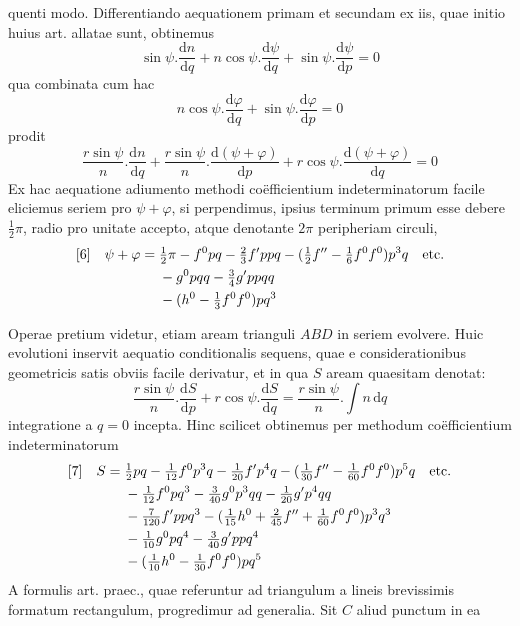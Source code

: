 %
quenti modo. Differentiando aequationem primam et secundam ex iis, quae initio huius art. allatae sunt, obtinemus
\[
\sin\psi\mathord{.}\frac{\mathrm{d}n}{\mathrm{d}q}+n\cos\psi\mathord{.}\frac{\mathrm{d}\psi}{\mathrm{d}q}+\sin\psi\mathord{.}\frac{\mathrm{d}\psi}{\mathrm{d}p}=0
\]
qua combinata cum hac
\[
n\cos\psi\mathord{.}\frac{\mathrm{d}\varphi}{\mathrm{d}q}+\sin\psi\mathord{.}\frac{\mathrm{d}\varphi}{\mathrm{d}p}=0
\]
prodit
\[
\frac{r\sin\psi}{n}\mathord{.}\frac{\mathrm{d}n}{\mathrm{d}q}+\frac{r\sin\psi}{n}\mathord{.}\frac{\mathrm{d}(\psi+\varphi)}{\mathrm{d}p}+r\cos\psi\mathord{.}\frac{\mathrm{d}(\psi+\varphi)}{\mathrm{d}q}=0
\]
Ex hac aequatione adiumento methodi coëfficientium indeterminatorum facile eliciemus seriem pro \(\psi+\varphi\), si perpendimus, ipsius terminum primum esse debere \(\tfrac{1}{2}\pi\), radio pro unitate accepto, atque denotante \(2\pi\) peripheriam circuli,
\[
\begin{aligned}
\relax[6]\quad\psi+\varphi={}&\tfrac{1}{2}\pi-f^0pq-\tfrac{2}{3}f'ppq-(\tfrac{1}{2}f''-\tfrac{1}{6}f^0f^0)p^3q\quad\text{etc.}\\
&-g^0pqq-\tfrac{3}{4}g'ppqq\\
&-(h^0-\tfrac{1}{3}f^0f^0)pq^3
\end{aligned}
\]

Operae pretium videtur, etiam aream trianguli \(ABD\) in seriem evolvere. Huic evolutioni inservit aequatio conditionalis sequens, quae e considerationibus geometricis satis obviis facile derivatur, et in qua \(S\) aream quaesitam denotat:
\[
\frac{r\sin\psi}{n}\mathord{.}\frac{\mathrm{d}S}{\mathrm{d}p}+r\cos\psi\mathord{.}\frac{\mathrm{d}S}{\mathrm{d}q}=\frac{r\sin\psi}{n}\mathord{.}\int n\,\mathrm{d}q
\]
integratione a \(q=0\) incepta. Hinc scilicet obtinemus per methodum coëfficientium indeterminatorum
\[
\begin{aligned}
\relax[7]\quad S={}&\tfrac{1}{2}pq-\tfrac{1}{12}f^0p^3q-\tfrac{1}{20}f'p^4q-(\tfrac{1}{30}f''-\tfrac{1}{60}f^0f^0)p^5q\quad\text{etc.}\\
&-\tfrac{1}{12}f^0pq^3-\tfrac{3}{40}g^0p^3qq-\tfrac{1}{20}g'p^4qq\\
&-\tfrac{7}{120}f'ppq^3-(\tfrac{1}{15}h^0+\tfrac{2}{45}f''+\tfrac{1}{60}f^0f^0)p^3q^3\\
&-\tfrac{1}{10}g^0pq^4-\tfrac{3}{40}g'ppq^4\\
&-(\tfrac{1}{10}h^0-\tfrac{1}{30}f^0f^0)pq^5
\end{aligned}
\]
A formulis art. praec., quae referuntur ad triangulum a lineis brevissimis formatum rectangulum, progredimur ad generalia. Sit \(C\) aliud punctum in ea%
